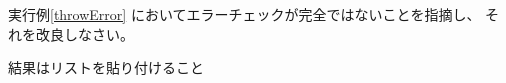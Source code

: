 \begin{Prob}\upshape\label{CorrectErrorCheck}
 実行例\else\ref{throwError}\fi
 においてエラーチェックが完全ではないことを指摘し、
 それを改良しなさい。
\end{Prob}
\ifText 結果はリストを貼り付けること\vspace{0.3\textheight}\fi